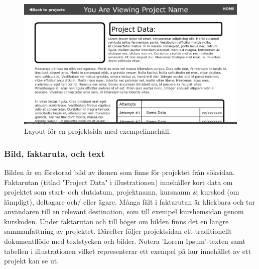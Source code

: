 \documentclass{liu_mall}
\begin{document}
    \begin{figure}[h!]
        \centering
        \includegraphics{LOFI Project Page}
        \caption{Layout för en projektsida med exempelinnehåll.}
        \label{fig:Low-Fidelity-Prototyp Project Page}
    \end{figure}

    \subsubsection{Bild, faktaruta, och text}
        Bilden är en förstorad bild av ikonen som finns för projektet från söksidan. Faktarutan (titlad "Project Data" i illustrationen) innehåller kort data om projektet som start- och slutdatum, projektnamn, kursnamn \& kurskod (om lämpligt), deltagare och/ eller ägare. Många fält i faktarutan är klickbara och tar användaren till en relevant destination, som till exempel kurshemsidan genom kurskoden. Under faktarutan och till höger om bilden finns det en längre sammanfattning av projektet. Därefter följer projektsidan ett traditionellt dokumentflöde med textstycken och bilder. Notera 'Lorem Ipsum'-texten samt tabellen i illustrationen vilket representerar ett exempel på hur innehållet av ett projekt kan se ut.
\end{document}
